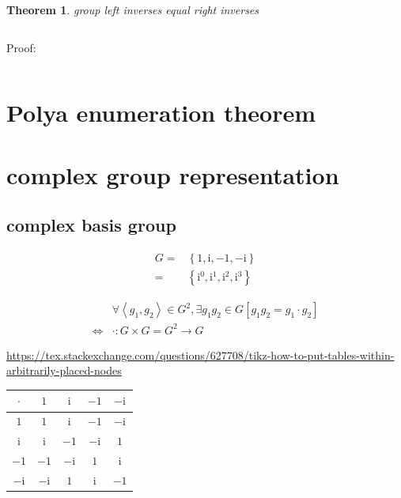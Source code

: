 \documentclass[
]{book}
\newtheorem{theorem}{Theorem}[chapter]
\theoremstyle{definition}
\theoremstyle{definition}
\theoremstyle{definition}
\theoremstyle{definition}
\theoremstyle{remark}
\begin{document}
\begin{theorem}
\protect\hypertarget{thm:unnamed-chunk-2}{}\label{thm:unnamed-chunk-2}group left inverses equal right inverses
\end{theorem}

\[
\
\]

Proof:

\[
\ \tag*{$\Box$}
\]

\section{Polya enumeration theorem}\label{polya-enumeration-theorem}

\section{complex group representation}\label{complex-group-representation}

\subsection{complex basis group}\label{complex-basis-group}

\[
\begin{aligned}
G= & \left\{ 1,\mathrm{i},-1,-\mathrm{i}\right\} \\
= & \left\{ \mathrm{i}^{0},\mathrm{i}^{1},\mathrm{i}^{2},\mathrm{i}^{3}\right\} 
\end{aligned}
\]

\[
\begin{aligned}
 & \forall\left\langle g_{{\scriptscriptstyle 1}},g_{{\scriptscriptstyle 2}}\right\rangle \in G^{2},\exists g_{{\scriptscriptstyle 1}}g_{{\scriptscriptstyle 2}}\in G\left[g_{{\scriptscriptstyle 1}}g_{{\scriptscriptstyle 2}}=g_{{\scriptscriptstyle 1}}\cdot g_{{\scriptscriptstyle 2}}\right]\\
\Leftrightarrow & \cdot:G\times G=G^{2}\rightarrow G
\end{aligned}
\]

\url{https://tex.stackexchange.com/questions/627708/tikz-how-to-put-tables-within-arbitrarily-placed-nodes}

\begin{tabular}{|c|c|c|c|c|}
\hline 
$\cdot$ & $1$ & $\mathrm{i}$ & $-1$ & $-\mathrm{i}$\tabularnewline
\hline 
$1$ & $1$ & $\mathrm{i}$ & $-1$ & $-\mathrm{i}$\tabularnewline
\hline 
$\mathrm{i}$ & $\mathrm{i}$ & $-1$ & $-\mathrm{i}$ & $1$\tabularnewline
\hline 
$-1$ & $-1$ & $-\mathrm{i}$ & $1$ & $\mathrm{i}$\tabularnewline
\hline 
$-\mathrm{i}$ & $-\mathrm{i}$ & $1$ & $\mathrm{i}$ & $-1$\tabularnewline
\hline 
\end{tabular}
\end{document}
